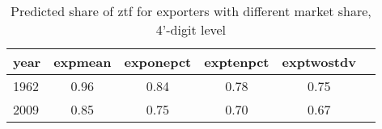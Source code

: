 \begin{table}[htbp]
\caption{\label{clabel} Predicted share of ztf for exporters with different market share, 4'-digit level}\centering\medskip
\begin{tabular}{|l|c|c|c|c|c|}\hline  
 \multicolumn{1}{c}{ year }  & expmean  & exponepct  & exptenpct  & exptwostdv  \\ \hline  
     1962 &      0.96 &      0.84 &      0.78 &      0.75 \\ \hline 
     2009 &      0.85 &      0.75 &      0.70 &      0.67 \\ \hline 
  \end{tabular}
\end{table}
